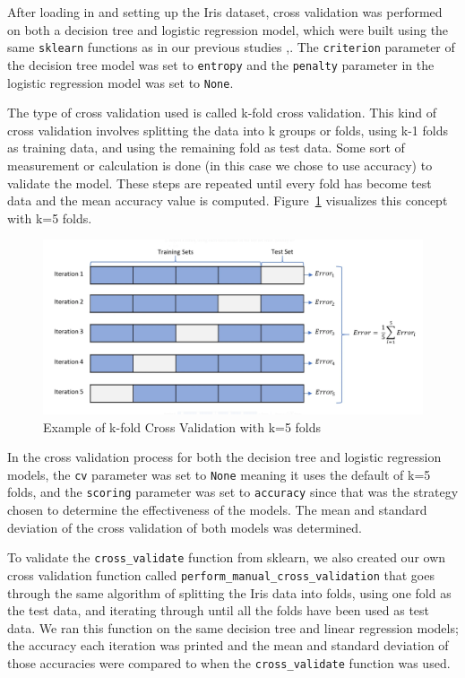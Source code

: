 \documentclass[journal]{IEEEtran}
\begin{document}
After loading in and setting up the Iris dataset, cross validation was performed on both a decision tree and logistic regression model, which were built using the same \lstinline{sklearn} functions as in our previous studies \cite{b2},\cite{b3}. The \lstinline{criterion} parameter of the decision tree model was set to \lstinline{entropy} and the \lstinline{penalty} parameter in the logistic regression model was set to \lstinline{None}.

The type of cross validation used is called k-fold cross validation. This kind of cross validation involves splitting the data into k groups or folds, using k-1 folds as training data, and using the remaining fold as test data. Some sort of measurement or calculation is done (in this case we chose to use accuracy) to validate the model. These steps are repeated until every fold has become test data and the mean accuracy value is computed. Figure~\ref{fig:kfoldCV} visualizes this concept with k=5 folds.

\begin{figure}[h!]
\includegraphics[scale=0.18]{5foldCV.png}
\centering
\caption{Example of k-fold Cross Validation with k=5 folds \cite{b4}}
\label{fig:kfoldCV}
\end{figure}

\newpage

In the cross validation process for both the decision tree and logistic regression models, the \lstinline{cv} parameter was set to \lstinline{None} meaning it uses the default of k=5 folds, and the \lstinline{scoring} parameter was set to \lstinline{accuracy} since that was the strategy chosen to determine the effectiveness of the models. The mean and standard deviation of the cross validation of both models was determined. 

To validate the \lstinline{cross_validate} function from sklearn, we also created our own cross validation function called \lstinline{perform_manual_cross_validation} that goes through the same algorithm of splitting the Iris data into folds, using one fold as the test data, and iterating through until all the folds have been used as test data. We ran this function on the same decision tree and linear regression models; the accuracy each iteration was printed and the mean and standard deviation of those accuracies were compared to when the \lstinline{cross_validate} function was used. 
\end{document}
